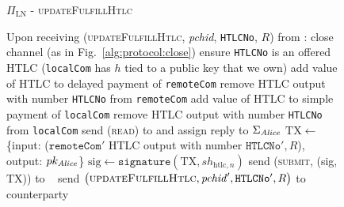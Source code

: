   \begin{figure}[H]
    \begin{protocolbox}{$\Pi_{\mathrm{LN}}$ - \textsc{updateFulfillHtlc}}
      \begin{algorithmic}[1]
        \State Upon receiving (\textsc{updateFulfillHtlc}, \textit{pchid},
        \texttt{HTLCNo}, $R$) from \bob:
        \Indent
            \State close channel (as in Fig.~\ref{alg:protocol:close})
            \State \Return
          \EndIf
          \State ensure \texttt{HTLCNo} is an offered HTLC (\texttt{localCom}
          has $h$ tied to a public key that we own)
          \State add value of HTLC to delayed payment of \texttt{remoteCom}
          \State remove HTLC output with number \texttt{HTLCNo} from
          \texttt{remoteCom}
          \State add value of HTLC to simple payment of \texttt{localCom}
          \State remove HTLC output with number \texttt{HTLCNo} from
          \texttt{localCom}
           
            \State send (\textsc{read}) to \ledger{} and assign reply to
            $\Sigma_{\mathit{Alice}}$
              \State $\mathrm{TX} \gets$ \{input: ($\mathtt{remoteCom}'$ HTLC
              output with number $\mathtt{HTLCNo}', R$), output:
              $pk_{\mathit{Alice}}$\}
              \State $\mathrm{sig} \gets \mathtt{signature}\left(\mathrm{TX},
              sh_{\mathrm{htlc}, n}\right)$
              \State send (\textsc{submit}, (sig, TX)) to \ledger{}
              \label{alg:protocol:pay:updateFulfillHtlc:submit}
            \Else \ 
              \State {}
              \State send $\left(\textsc{updateFulfillHtlc}, \mathit{pchid}',
              \mathtt{HTLCNo}', R\right)$ to counterparty
            \EndIf
          \EndIf
        \EndIndent
      \end{algorithmic}
    \end{protocolbox}
    \caption{}
    \label{alg:protocol:pay:updateFulfillHtlc}
  \end{figure}

